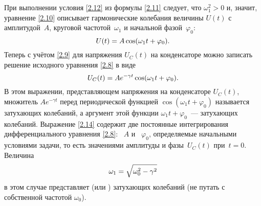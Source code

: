 При выполнении условия
\eqref{2.12} из формулы \eqref{2.11} следует, что $\omega_1^2>0$ и, значит,
уравнение \eqref{2.10} описывает гармонические колебания величины $U(t)$ с
амплитудой~$A$, круговой частотой~$\omega_1$ и начальной фазой~$\varphi_0$:
\begin{equation*}\eqmark{2.13}
U(t)=A\cos(\omega_1t+\varphi_0).
\end{equation*}
Теперь с учётом \eqref{2.9} для напряжения $U_C(t)$ на конденсаторе
можно записать решение исходного уравнения \eqref{2.8} в виде
\begin{equation}\eqmark{2.14}
U_C(t)=Ae^{-\gamma t}\cos(\omega_1t+\varphi_0).
\end{equation}
В этом выражении, представляющем  напряжения на
конденсаторе $U_C(t)$, множитель $A e^{-\gamma t}$ перед периодической функцией
$\cos(\omega_1 t+\varphi_0)$ называется  затухающих
колебаний, а аргумент этой функции $\omega_1t+\varphi_0$~---  затухающих
колебаний. Выражение \eqref{2.14} содержит две постоянные интегрирования
дифференциального уравнения \eqref{2.8}: ~$A$ и
~$\varphi_0$, определяемые начальными условиями
задачи, то есть значениями амплитуды и фазы~$U_C(t)$ при~$t=0$. Величина
\begin{equation}\eqmark{2.15}
\omega_1=\sqrt{\omega_0^2-\gamma^2}
\end{equation}
в этом случае представляет  (или
) затухающих колебаний 
(не путать с собственной частотой $\omega_0$).

